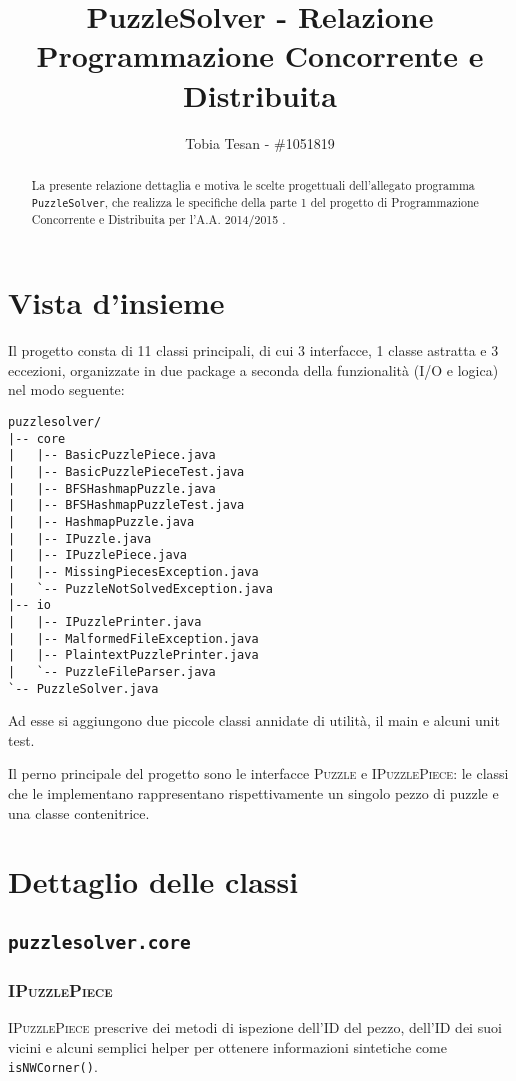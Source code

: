 \documentclass[a4paper]{article}
\title{PuzzleSolver - Relazione Programmazione Concorrente e Distribuita}
\author{Tobia Tesan - \#1051819}
\newcommand{\Classname}[1]{\textsc{#1}}
\newcommand{\Ifacename}[1]{\textsc{#1}}
\newcommand{\Methodname}[1]{\texttt{#1}}
\newcommand{\Pkgname}[1]{\texttt{#1}}
\begin{document}
\maketitle
\tableofcontents

\begin{abstract}
La presente relazione dettaglia e motiva le scelte progettuali dell'allegato programma \texttt{PuzzleSolver}, che realizza le specifiche della parte 1 del progetto di Programmazione Concorrente e Distribuita per l'A.A. 2014/2015 \cite{prspec}.
\end{abstract}

\section{Vista d'insieme}

Il progetto consta di 11 classi principali, di cui 3 interfacce, 1 classe astratta e 3 eccezioni, organizzate in due package a seconda della funzionalit\`a (I/O e logica) nel modo seguente:

\begin{verbatim}
puzzlesolver/
|-- core
|   |-- BasicPuzzlePiece.java
|   |-- BasicPuzzlePieceTest.java
|   |-- BFSHashmapPuzzle.java
|   |-- BFSHashmapPuzzleTest.java
|   |-- HashmapPuzzle.java
|   |-- IPuzzle.java
|   |-- IPuzzlePiece.java
|   |-- MissingPiecesException.java
|   `-- PuzzleNotSolvedException.java
|-- io
|   |-- IPuzzlePrinter.java
|   |-- MalformedFileException.java
|   |-- PlaintextPuzzlePrinter.java
|   `-- PuzzleFileParser.java
`-- PuzzleSolver.java
\end{verbatim}

Ad esse si aggiungono due piccole classi annidate di utilit\`a, il main e alcuni unit test.

Il perno principale del progetto sono le interfacce \Ifacename{Puzzle} e \Ifacename{IPuzzlePiece}: le classi che le implementano rappresentano rispettivamente un singolo pezzo di puzzle e una classe contenitrice.

\section{Dettaglio delle classi}
\subsection{\Pkgname{puzzlesolver.core}}
\subsubsection{\Classname{IPuzzlePiece}}
\Ifacename{IPuzzlePiece} prescrive dei metodi di ispezione dell'ID del pezzo, dell'ID dei suoi vicini e alcuni semplici helper per ottenere informazioni sintetiche come \Methodname{isNWCorner()}.
\end{document}
